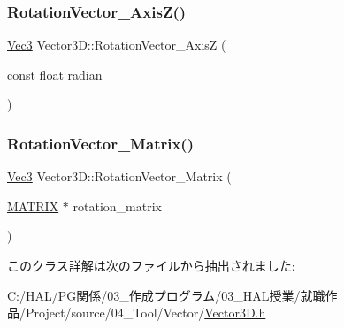 \mbox{\label{class_vector3_d_ac893f738dde87e5981dcff5d5515ede6}} 
\subsubsection{\texorpdfstring{Rotation\+Vector\+\_\+\+Axis\+Z()}{RotationVector\_AxisZ()}}
{\footnotesize\ttfamily \mbox{\hyperlink{_vector3_d_8h_ab16f59e4393f29a01ec8b9bbbabbe65d}{Vec3}} Vector3\+D\+::\+Rotation\+Vector\+\_\+\+AxisZ (\begin{DoxyParamCaption}\item[{const float}]{radian }\end{DoxyParamCaption})\hspace{0.3cm}{\ttfamily [inline]}}

\mbox{\label{class_vector3_d_aa368719da4c1ac4e8a727edbd09ec390}} 
\subsubsection{\texorpdfstring{Rotation\+Vector\+\_\+\+Matrix()}{RotationVector\_Matrix()}}
{\footnotesize\ttfamily \mbox{\hyperlink{_vector3_d_8h_ab16f59e4393f29a01ec8b9bbbabbe65d}{Vec3}} Vector3\+D\+::\+Rotation\+Vector\+\_\+\+Matrix (\begin{DoxyParamCaption}\item[{\mbox{\hyperlink{_vector3_d_8h_a032295cd9fb1b711757c90667278e744}{M\+A\+T\+R\+IX}} $\ast$}]{rotation\+\_\+matrix }\end{DoxyParamCaption})\hspace{0.3cm}{\ttfamily [inline]}}



このクラス詳解は次のファイルから抽出されました\+:\begin{DoxyCompactItemize}
\item 
C\+:/\+H\+A\+L/\+P\+G関係/03\+\_\+作成プログラム/03\+\_\+\+H\+A\+L授業/就職作品/\+Project/source/04\+\_\+\+Tool/\+Vector/\mbox{\hyperlink{_vector3_d_8h}{Vector3\+D.\+h}}\end{DoxyCompactItemize}
